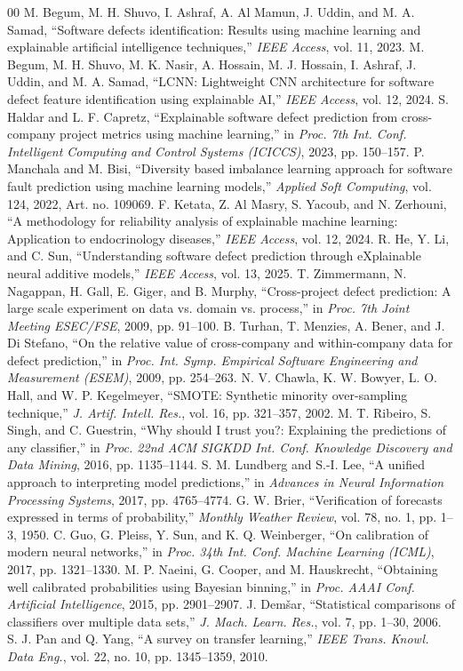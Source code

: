 \documentclass[conference]{IEEEtran}
\begin{document}
\begin{thebibliography}{00}
 M. Begum, M. H. Shuvo, I. Ashraf, A. Al Mamun, J. Uddin, and M. A. Samad, ``Software defects identification: Results using machine learning and explainable artificial intelligence techniques,'' \emph{IEEE Access}, vol. 11, 2023.
 M. Begum, M. H. Shuvo, M. K. Nasir, A. Hossain, M. J. Hossain, I. Ashraf, J. Uddin, and M. A. Samad, ``LCNN: Lightweight CNN architecture for software defect feature identification using explainable AI,'' \emph{IEEE Access}, vol. 12, 2024.
 S. Haldar and L. F. Capretz, ``Explainable software defect prediction from cross-company project metrics using machine learning,'' in \emph{Proc. 7th Int. Conf. Intelligent Computing and Control Systems (ICICCS)}, 2023, pp. 150--157.
 P. Manchala and M. Bisi, ``Diversity based imbalance learning approach for software fault prediction using machine learning models,'' \emph{Applied Soft Computing}, vol. 124, 2022, Art. no. 109069.
 F. Ketata, Z. Al Masry, S. Yacoub, and N. Zerhouni, ``A methodology for reliability analysis of explainable machine learning: Application to endocrinology diseases,'' \emph{IEEE Access}, vol. 12, 2024.
 R. He, Y. Li, and C. Sun, ``Understanding software defect prediction through eXplainable neural additive models,'' \emph{IEEE Access}, vol. 13, 2025.
 T. Zimmermann, N. Nagappan, H. Gall, E. Giger, and B. Murphy, ``Cross-project defect prediction: A large scale experiment on data vs. domain vs. process,'' in \emph{Proc. 7th Joint Meeting ESEC/FSE}, 2009, pp. 91--100.
 B. Turhan, T. Menzies, A. Bener, and J. Di Stefano, ``On the relative value of cross-company and within-company data for defect prediction,'' in \emph{Proc. Int. Symp. Empirical Software Engineering and Measurement (ESEM)}, 2009, pp. 254--263.
 N. V. Chawla, K. W. Bowyer, L. O. Hall, and W. P. Kegelmeyer, ``SMOTE: Synthetic minority over-sampling technique,'' \emph{J. Artif. Intell. Res.}, vol. 16, pp. 321--357, 2002.
 M. T. Ribeiro, S. Singh, and C. Guestrin, ``Why should I trust you?: Explaining the predictions of any classifier,'' in \emph{Proc. 22nd ACM SIGKDD Int. Conf. Knowledge Discovery and Data Mining}, 2016, pp. 1135--1144.
 S. M. Lundberg and S.-I. Lee, ``A unified approach to interpreting model predictions,'' in \emph{Advances in Neural Information Processing Systems}, 2017, pp. 4765--4774.
 G. W. Brier, ``Verification of forecasts expressed in terms of probability,'' \emph{Monthly Weather Review}, vol. 78, no. 1, pp. 1--3, 1950.
 C. Guo, G. Pleiss, Y. Sun, and K. Q. Weinberger, ``On calibration of modern neural networks,'' in \emph{Proc. 34th Int. Conf. Machine Learning (ICML)}, 2017, pp. 1321--1330.
 M. P. Naeini, G. Cooper, and M. Hauskrecht, ``Obtaining well calibrated probabilities using Bayesian binning,'' in \emph{Proc. AAAI Conf. Artificial Intelligence}, 2015, pp. 2901--2907.
 J. Dem\v{s}ar, ``Statistical comparisons of classifiers over multiple data sets,'' \emph{J. Mach. Learn. Res.}, vol. 7, pp. 1--30, 2006.
 S. J. Pan and Q. Yang, ``A survey on transfer learning,'' \emph{IEEE Trans. Knowl. Data Eng.}, vol. 22, no. 10, pp. 1345--1359, 2010.
\end{thebibliography}
\end{document}

